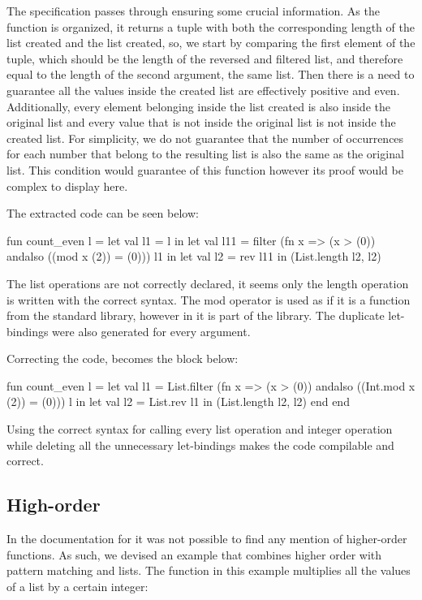 The specification passes through ensuring some crucial information. As the function is organized, it returns a tuple with both the 
corresponding length of the list created and the list created, so, we start by comparing the first element of the tuple, which should 
be the length of the reversed and filtered list, and therefore equal to the length of the second argument, the same list. Then there is 
a need to guarantee all the values inside the created list are effectively positive and even. Additionally, every element belonging 
inside the list created is also inside the original list and every value that is not inside the original list is not inside the created 
list. For simplicity, we do not guarantee that the number of occurrences for each number that belong to the resulting list is also 
the same as the original list. This condition would guarantee of this function however its proof would be complex to display here.

The extracted code can be seen below:

\begin{cakeml}
fun count_even l =
  let val l1 = l in
  let val l11 = filter (fn x => (x > (0)) andalso ((mod x (2)) = (0))) l1 in
  let val l2 = rev l11 in (List.length l2, l2)
\end{cakeml}

The list operations are not correctly declared, it seems only the length operation is written with the correct syntax. The mod operator
is used as if it is a function from the standard library, however in \cml it is part of the  library. The duplicate 
let-bindings were also generated for every argument.

Correcting the code, becomes the block below:

\begin{cakeml}
fun count_even l =
  let val l1 = List.filter (fn x => (x > (0)) andalso ((Int.mod x (2)) = (0))) l in
  let val l2 = List.rev l1 in (List.length l2, l2) end end
\end{cakeml}

Using the correct syntax for calling every list operation and integer operation while deleting all the unnecessary let-bindings makes the
code compilable and correct.

\subsection{High-order}

In the documentation for \cml it was not possible to find any mention of higher-order functions. As such, we devised an example that
combines higher order with pattern matching and lists. The function in this example multiplies all the values of a list by a certain
integer:

